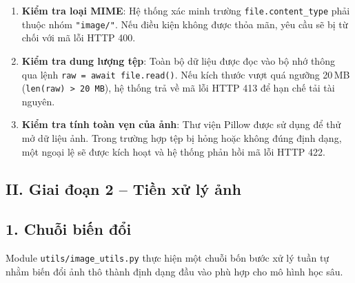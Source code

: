 \begin{sloppypar}
\begin{enumerate}
    \item \textbf{Kiểm tra loại MIME}: Hệ thống xác minh trường \texttt{file.content\_type} phải thuộc nhóm \texttt{"image/"}. Nếu điều kiện không được thỏa mãn, yêu cầu sẽ bị từ chối với mã lỗi HTTP 400.

    \item \textbf{Kiểm tra dung lượng tệp}: Toàn bộ dữ liệu được đọc vào bộ nhớ thông qua lệnh \texttt{raw = await file.read()}. Nếu kích thước vượt quá ngưỡng 20\,MB (\texttt{len(raw) > 20\,MB}), hệ thống trả về mã lỗi HTTP 413 để hạn chế tải tài nguyên.

    \item \textbf{Kiểm tra tính toàn vẹn của ảnh}: Thư viện Pillow được sử dụng để thử mở dữ liệu ảnh. Trong trường hợp tệp bị hỏng hoặc không đúng định dạng, một ngoại lệ sẽ được kích hoạt và hệ thống phản hồi mã lỗi HTTP 422.
\end{enumerate}
\end{sloppypar}
\subsection*{II. Giai đoạn 2 -- Tiền xử lý ảnh}

\subsection*{1. Chuỗi biến đổi}

Module \texttt{utils/image\_utils.py} thực hiện một chuỗi bốn bước xử lý tuần tự nhằm biến đổi ảnh thô thành định dạng đầu vào phù hợp cho mô hình học sâu.

